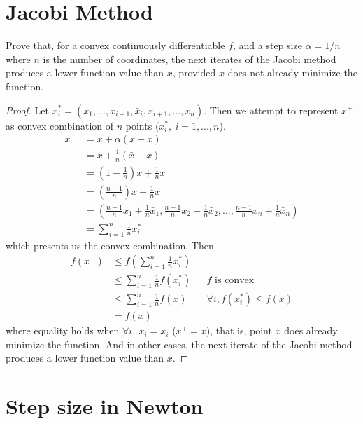\documentclass[11pt,a4paper]{article}
\begin{document}
\section{Jacobi Method}
Prove that, for a convex continuously differentiable $f$, and a step size
$\alpha = 1/n$ where $n$ is the number of coordinates, the next iterates of
the Jacobi method produces a lower function value than $x$, provided $x$ does
not already minimize the function.

\begin{proof}
    Let $x^*_i = (x_1, ..., x_{i-1}, \bar{x}_i, x_{i+1}, ..., x_n)$. Then we
    attempt to represent $x^{+}$ as convex combination of $n$ points
    ($x^*_i,\ i = 1,...,n$).
    \begin{align}
        x^{+} &= x + \alpha (\bar{x} - x) \\
        &= x + \frac{1}{n} (\bar{x} - x) \\
        &= (1 - \frac{1}{n})x +  \frac{1}{n}\bar{x} \\
        &= (\frac{n-1}{n})x +  \frac{1}{n}\bar{x} \\
        &= \left( \frac{n-1}{n}x_1 + \frac{1}{n} \bar{x}_1 ,
                \frac{n-1}{n}x_2 + \frac{1}{n} \bar{x}_2 ,
                    ... ,
                \frac{n-1}{n}x_n + \frac{1}{n} \bar{x}_n \right) \\
            &= \sum_{i=1}^{n} \frac{1}{n} x_i^* 
    \end{align}
    which presents us the convex combination. Then
    \begin{align}
        f(x^+) &\leq f(\sum_{i=1}^n \frac{1}{n} x_i^*)  \\
        &\leq \sum_{i=1}^n \frac{1}{n} f (x_i^*) && f \text{ is convex } \\
        &\leq \sum_{i=1}^n \frac{1}{n} f (x) && \forall i, f(x_i^*) \leq f(x) \\
        &= f(x)
    \end{align}
    where equality holds when $\forall i,\ x_i = \bar{x}_i$ ($x^+ = x$), that is, point
    $x$ does already minimize the function. And in other cases, the next
    iterate of the Jacobi method produces a lower function value than $x$.
\end{proof}

\newpage
\section{Step size in Newton}
\end{document}
